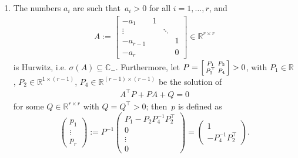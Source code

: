 \documentclass[ envcountsect, envcountsame]{svjour3}
\newtheorem{Assumption}{Assumption}
\newcommand{\R}{\mathbb{R}}
\newcommand{\C}{\mathbb{C}}
\newenvironment{smallbmatrix}%
{\left[\begin{smallmatrix}}%
{\end{smallmatrix}\right]}%
\begin{document}
\begin{enumerate}[label = \textbf{(A.\arabic{enumi})}, ref=(A.\arabic{enumi}),leftmargin=*]
\item \label{Ass:A-Hurwitz}
The numbers $a_{i}$ are such that~$a_i > 0$ for all $i=1,\ldots,r$, and
\begin{align*} %
A := \begin{bmatrix}
-a_1 & 1 & &\\ \vdots & & \ddots &  \\ -a_{r-1} & & & 1 \\ -a_{r} & & &0
\end{bmatrix} \in \R^{r \times r}
\end{align*}
is Hurwitz, i.e. $\sigma(A) \subseteq \C_-$. 
Furthermore, let
$P = \begin{smallbmatrix}  P_1 &  P_{2} \\  P_{2}^\top &  P_{4} \end{smallbmatrix} > 0$, with $ P_1 \in \R$, $ P_{2} \in \R^{1 \times (r-1)}$, $ P_{4} \in \R^{(r-1) \times (r-1)}$ 
be the solution of
\begin{align*} %
A^\top P + P A + Q = 0 
\end{align*}
for some $Q \in \R^{r \times r}$ with $Q = Q^\top > 0$; then~$p$ is defined as
\begin{equation*} %
\begin{pmatrix}
p_{1 }\\ \vdots \\ p_{r} \end{pmatrix} :=
P^{-1}\begin{pmatrix}
 P_1 -  P_{2}  P_{4}^{-1}  P_{2}^\top  \\ 0 \\ \vdots \\ 0
\end{pmatrix} 
= \begin{pmatrix}
1 \\ -  P_{4}^{-1}  P_{2}^\top 
\end{pmatrix}.
\end{equation*}

\end{enumerate}
\end{document}
